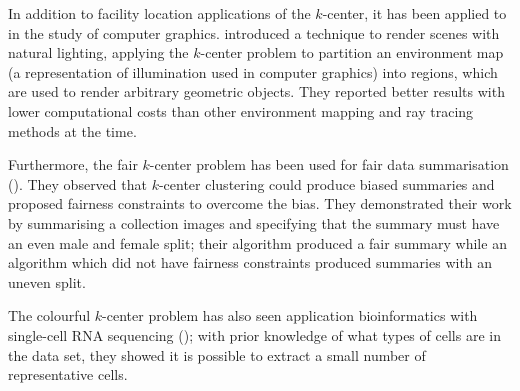 In addition to facility location applications of the $k$-center, it has been applied to in the study of computer graphics. \textcite{agarwal_structured_2003} introduced a technique to render scenes with natural lighting, applying the $k$-center problem to partition an environment map (a representation of illumination used in computer graphics) into regions, which are used to render arbitrary geometric objects. They reported better results with lower computational costs than other environment mapping and ray tracing methods at the time.

Furthermore, the fair $k$-center problem has been used for fair data summarisation (\cite{kleindessner_fair_2019}). They observed that $k$-center clustering could produce biased summaries and proposed fairness constraints to overcome the bias. They demonstrated their work by summarising a collection images and specifying that the summary must have an even male and female split; their algorithm produced a fair summary while an algorithm which did not have fairness constraints produced summaries with an uneven split. 

The colourful $k$-center problem has also seen application bioinformatics with single-cell RNA sequencing (\cite{do_sphetcher_2020}); with prior knowledge of what types of cells are in the data set, they showed it is possible to extract a small number of representative cells.